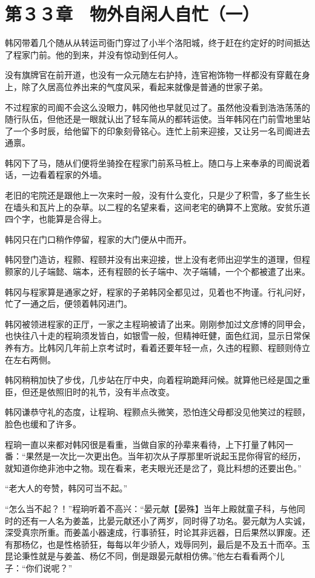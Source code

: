 \section{第３３章　物外自闲人自忙（一）}

韩冈带着几个随从从转运司衙门穿过了小半个洛阳城，终于赶在约定好的时间抵达了程家门前。他的到来，并没有惊动到任何人。

没有旗牌官在前开道，也没有一众元随左右护持，连官袍饰物一样都没有穿戴在身上，除了久居高位养出来的气度风采，看起来就像是普通的世家子弟。

不过程家的司阍不会这么没眼力，韩冈他也早就见过了。虽然他没看到浩浩荡荡的随行队伍，但他还是一眼就认出了轻车简从的都转运使。当年韩冈在门前雪地里站了一个多时辰，给他留下的印象刻骨铭心。连忙上前来迎接，又让另一名司阍进去通禀。

韩冈下了马，随从们便将坐骑拴在程家门前系马桩上。随口与上来奉承的司阍说着话，一边看着程家的外墙。

老旧的宅院还是跟他上一次来时一般，没有什么变化，只是少了积雪，多了些生长在墙头和瓦片上的杂草。以二程的名望来看，这间老宅的确算不上宽敞。安贫乐道四个字，也能算是合得上。

韩冈只在门口稍作停留，程家的大门便从中而开。

韩冈登门造访，程颢、程颐并没有出来迎接，世上没有老师出迎学生的道理，但程颢家的儿子端懿、端本，还有程颐的长子端中、次子端辅，一个个都被遣了出来。

韩冈与程家算是通家之好，程家的子弟韩冈全都见过，见着也不拘谨。行礼问好，忙了一通之后，便领着韩冈进门。

韩冈被领进程家的正厅，一家之主程珦被请了出来。刚刚参加过文彦博的同甲会，也快往八十走的程珦须发皆白，如银雪一般，但精神旺健，面色红润，显示日常保养有方。比韩冈几年前上京考试时，看着还要年轻一点，久违的程颢、程颐则侍立在左右两侧。

韩冈稍稍加快了步伐，几步站在厅中央，向着程珦跪拜问候。就算他已经是国之重臣，但还是依照旧时的礼节，没有半点改变。

韩冈谦恭守礼的态度，让程珦、程颢点头微笑，恐怕连父母都没见他笑过的程颐，脸色也缓和了许多。

程珦一直以来都对韩冈很是看重，当做自家的孙辈来看待，上下打量了韩冈一番：“果然是一次比一次更出色。当年初次从子厚那里听说起玉昆你得官的经历，就知道你绝非池中之物。现在看来，老夫眼光还是岔了，竟比料想的还要出色。”

“老大人的夸赞，韩冈可当不起。”

“怎么当不起？！”程珦听着不高兴：“晏元献【晏殊】当年上殿就童子科，与他同时的还有一人名为姜盖，比晏元献还小了两岁，同时得了功名。晏元献为人实诚，深受真宗所重。而姜盖小器速成，行事骄狂，时论其非远器，日后果然以罪废。还有那杨亿，也是性格骄狂，每每以年少骄人，戏辱同列，最后是不及五十而卒。玉昆论秉性就是与姜盖、杨亿不同，倒是跟晏元献相仿佛。”他左右看看两个儿子：“你们说呢？”

